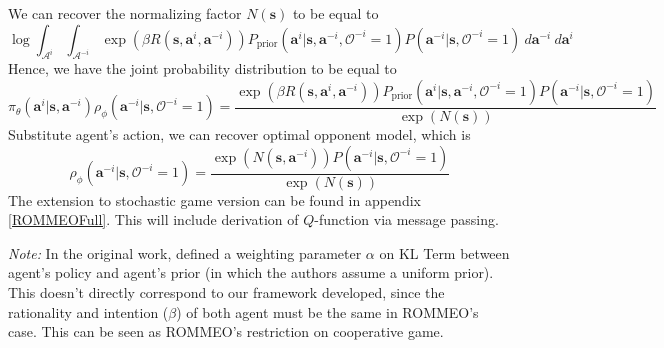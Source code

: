 We can recover the normalizing factor $N(\boldsymbol{s})$ to be equal to 
\begin{equation}
    \log \int_{\mathcal{A}^i} \int_{\mathcal{A}^{-i}} \exp\left(\beta R(\boldsymbol{s}, \boldsymbol{a}^i, \boldsymbol{a}^{-i})\right)P_{\text{prior}}(\boldsymbol{a}^i | \boldsymbol{s}, \boldsymbol{a}^{-i}, \mathcal{O}^{-i} = 1)P(\boldsymbol{a}^{-i} |\boldsymbol{s}, \mathcal{O}^{-i} = 1) \  d\boldsymbol{a}^{-i} \ d\boldsymbol{a}^i
\end{equation}
Hence, we have the joint probability distribution to be equal to 
\begin{equation}
    \pi_{\theta}(\boldsymbol{a}^i | \boldsymbol{s}, \boldsymbol{a}^{-i}) \rho_{\phi}(\boldsymbol{a}^{-i} | \boldsymbol{s}, \mathcal{O}^{-i} = 1) = \frac{\exp\left(\beta R(\boldsymbol{s}, \boldsymbol{a}^i, \boldsymbol{a}^{-i})\right)P_{\text{prior}}(\boldsymbol{a}^i | \boldsymbol{s}, \boldsymbol{a}^{-i}, \mathcal{O}^{-i} = 1)P(\boldsymbol{a}^{-i} |\boldsymbol{s}, \mathcal{O}^{-i} = 1)}{\exp (N(\boldsymbol{s}))}
\end{equation}
Substitute agent's action, we can recover optimal opponent model, which is 
\begin{equation}
    \rho_{\phi}(\boldsymbol{a}^{-i} | \boldsymbol{s}, \mathcal{O}^{-i} = 1) = \frac{\exp (N(\boldsymbol{s}, \boldsymbol{a}^{-i})) P(\boldsymbol{a}^{-i} |\boldsymbol{s}, \mathcal{O}^{-i} = 1)}{\exp (N(\boldsymbol{s}))}
\end{equation}
The extension to stochastic game version can be found in appendix \ref{ROMMEOFull}. This will include derivation of $Q$-function via message passing. 

\emph{Note:} In the original work, \cite{tian2019regularized} defined a weighting parameter $\alpha$ on KL Term between agent's policy and agent's prior (in which the authors assume a uniform prior). This doesn't directly correspond to our framework developed, since the rationality and intention ($\beta$) of both agent must be the same in ROMMEO's case. This can be seen as ROMMEO's restriction on cooperative game.
 
